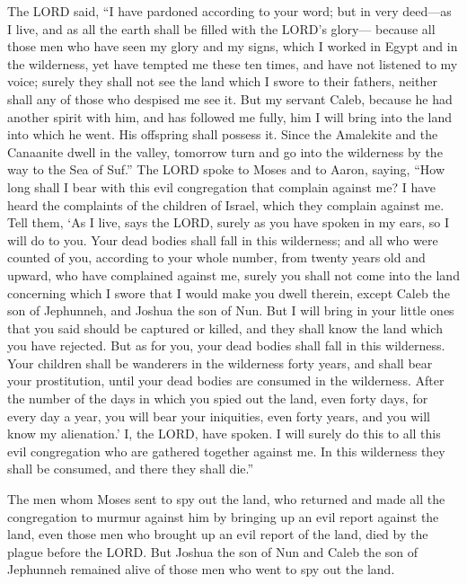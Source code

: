 \myverse{}The LORD said, “I have pardoned according to your word;
\myverse{}but in very deed—as I live, and as all the earth shall be filled with the
LORD’s glory—
\myverse{}because all those men who have seen my glory and my signs, which I worked
in Egypt and in the wilderness, yet have tempted me these ten times, and have not listened to my voice;
\myverse{}surely they shall not see the land which I swore to their fathers, neither
shall any of those who despised me see it.
\myverse{}But my servant Caleb, because he had another spirit with him, and has followed
me fully, him I will bring into the land into which he went. His offspring shall possess it.
\myverse{}Since the Amalekite and the Canaanite dwell in the valley, tomorrow turn
and go into the wilderness by the way to the Sea of Suf.”
\myverse{}The LORD spoke to Moses and to Aaron, saying,
\myverse{}“How long shall I bear with this evil congregation that complain against
me? I have heard the complaints of the children of Israel, which they complain against me.
\myverse{}Tell them, ‘As I live, says the LORD, surely as you have spoken in my ears,
so I will do to you.
\myverse{}Your dead bodies shall fall in this wilderness; and all who were counted
of you, according to your whole number, from twenty years old and upward, who have complained against
me,
\myverse{}surely you shall not come into the land concerning which I swore that I would
make you dwell therein, except Caleb the son of Jephunneh, and Joshua the son of Nun.
\myverse{}But I will bring in your little ones that you said should be captured or
killed, and they shall know the land which you have rejected.
\myverse{}But as for you, your dead bodies shall fall in this wilderness.
\myverse{}Your children shall be wanderers in the wilderness forty years, and shall
bear your prostitution, until your dead bodies are consumed in the wilderness.
\myverse{}After the number of the days in which you spied out the land, even forty
days, for every day a year, you will bear your iniquities, even forty years, and you will know my alienation.’
\myverse{}I, the LORD, have spoken. I will surely do this to all this evil congregation
who are gathered together against me. In this wilderness they shall be consumed, and there they shall
die.”


\myverse{}The men whom Moses sent to spy out the land, who returned and
made all the congregation to murmur against him by bringing up an evil report against the land,
\myverse{}even those men who brought up an evil report of the land, died by the plague
before the LORD.
\myverse{}But Joshua the son of Nun and Caleb the son of Jephunneh remained alive of
those men who went to spy out the land.


